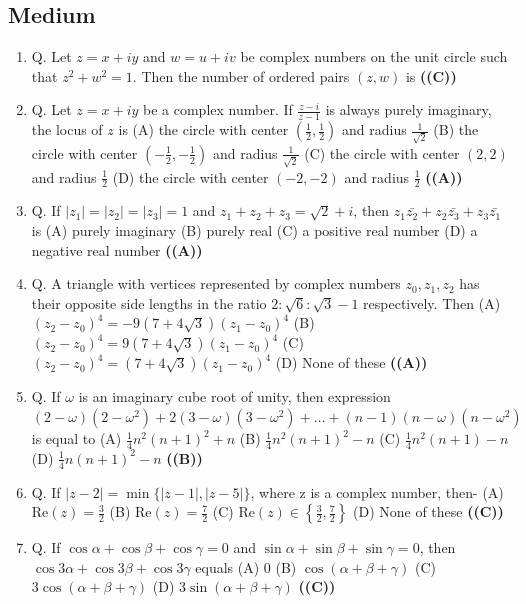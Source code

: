 \documentclass{article}
\begin{document}
\subsection{Medium}
\begin{enumerate}
\item Q. Let $z = x+iy$ and $w = u+iv$ be complex numbers on the unit circle such that $z^2+w^2 = 1$. Then the number of ordered pairs $(z, w)$ is \hfill \textbf{((C))}
\item Q. Let $z = x + iy$ be a complex number. If $\frac{z-i}{z-1}$ is always purely imaginary, the locus of $z$ is
(A) the circle with center $(\frac{1}{2}, \frac{1}{2})$ and radius $\frac{1}{\sqrt{2}}$
(B) the circle with center $(-\frac{1}{2}, -\frac{1}{2})$ and radius $\frac{1}{\sqrt{2}}$
(C) the circle with center $(2, 2)$ and radius $\frac{1}{2}$
(D) the circle with center $(-2, -2)$ and radius $\frac{1}{2}$ \hfill \textbf{((A))}
\item Q. If $|z_1| = |z_2| = |z_3| = 1$ and $z_1 + z_2 + z_3 = \sqrt{2} + i$, then $z_1\bar{z_2} + z_2\bar{z_3} + z_3\bar{z_1}$ is
(A) purely imaginary
(B) purely real
(C) a positive real number
(D) a negative real number \hfill \textbf{((A))}
\item Q. A triangle with vertices represented by complex numbers $z_0, z_1, z_2$ has their opposite side lengths in the ratio $2 : \sqrt{6} : \sqrt{3} - 1$ respectively. Then
(A) $(z_2-z_0)^4 = -9(7+4\sqrt{3}) (z_1 - z_0)^4$
(B) $(z_2-z_0)^4 = 9(7+4\sqrt{3}) (z_1 - z_0)^4$
(C) $(z_2-z_0)^4 = (7+4\sqrt{3}) (z_1 - z_0)^4$
(D) None of these \hfill \textbf{((A))}
\item Q. If $\omega$ is an imaginary cube root of unity, then expression $(2-\omega) (2 - \omega^2)+2(3-\omega) (3 - \omega^2)+\dots+ (n - 1)(n - \omega) (n - \omega^2)$ is equal to
(A) $\frac{1}{4}n^2(n + 1)^2 + n$
(B) $\frac{1}{4}n^2(n + 1)^2 - n$
(C) $\frac{1}{4}n^2(n + 1) - n$
(D) $\frac{1}{4}n(n+1)^2 - n$ \hfill \textbf{((B))}
\item Q. If $|z - 2| = \min\{|z - 1|, |z - 5|\}$, where z is a complex number, then-
(A) $\text{Re}(z) = \frac{3}{2}$
(B) $\text{Re}(z) = \frac{7}{2}$
(C) $\text{Re}(z) \in \left\{\frac{3}{2}, \frac{7}{2}\right\}$
(D) None of these \hfill \textbf{((C))}
\item Q. If $\cos \alpha + \cos \beta + \cos \gamma = 0$ and $\sin \alpha + \sin \beta + \sin \gamma = 0$, then $\cos 3\alpha + \cos3\beta + \cos 3\gamma$ equals
(A) 0
(B) $\cos(\alpha + \beta + \gamma)$
(C) $3\cos(\alpha + \beta + \gamma)$
(D) $3\sin(\alpha + \beta + \gamma)$ \hfill \textbf{((C))}

\end{enumerate}
\end{document}
